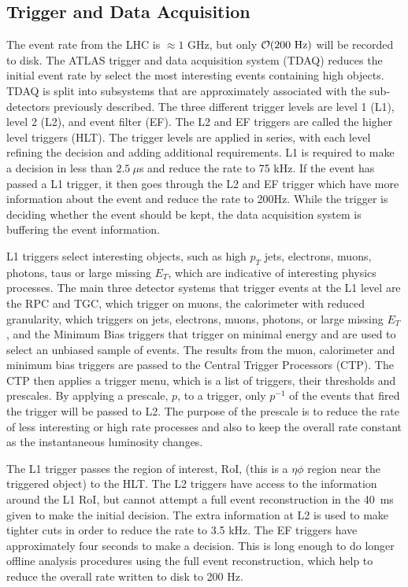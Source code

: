 \subsection{Trigger and Data Acquisition}
\label{sec:Det:Trig}
The event rate from the LHC is $\approx 1$ GHz, but only $\mathcal{O}(200~\rm Hz)$ will be recorded to disk. 
The ATLAS trigger and data acquisition system (TDAQ) reduces the initial event rate by select the most interesting events containing high \pt{} objects.
TDAQ is split into subsystems that are approximately associated with the sub-detectors previously described. 
The three different trigger levels are level 1 (L1), level 2 (L2), and event filter (EF). 
The L2 and EF triggers are called the higher level triggers (HLT). 
The trigger levels are applied in series, with each level refining the decision and adding additional requirements. 
L1 is required to make a decision in less than $2.5~\mu$s and reduce the rate to 75 kHz. 
If the event has passed a L1 trigger, it then goes through the L2 and EF trigger which have more information about the event and reduce the rate to 200Hz.
While the trigger is deciding whether the event should be kept, the data acquisition system is buffering the event information.


L1 triggers select interesting objects, such as high $p_T$ jets, electrons, muons, photons, taus or large missing $E_T$, which are indicative of interesting physics processes. 
The main three detector systems that trigger events at the L1 level are the RPC and TGC, which trigger on muons, the calorimeter with reduced granularity, which triggers on jets, electrons, muons, photons, or large missing $E_T$, and the Minimum Bias triggers that trigger on minimal energy and are used to select an unbiased sample of events. 
The results from the muon, calorimeter and minimum bias triggers are passed to the Central Trigger Processors (CTP). 
The CTP then applies a trigger menu, which is a list of triggers, their thresholds and prescales. 
By applying a prescale, $p$, to a trigger, only $p^{-1}$ of the events that fired the trigger will be passed to L2. 
The purpose of the prescale is to reduce the rate of less interesting or high rate processes and also to keep the overall rate constant as the instantaneous luminosity changes.

The L1 trigger passes the region of interest, RoI, (this is a $\eta\phi$ region near the triggered object) to the HLT.
The L2 triggers have access to the information around the L1 RoI, but cannot attempt a  full event reconstruction in the 40~ms given to make the initial decision. 
The extra information at L2 is used to make tighter cuts in order to reduce the rate to 3.5 kHz.
The EF triggers have approximately four seconds to make a decision.
This is long enough to do longer offline analysis procedures using the full event reconstruction, which help to reduce the overall rate written to disk to 200 Hz.

